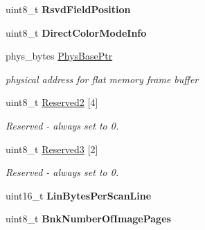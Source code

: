 \begin{DoxyCompactItemize}
\item 
uint8\+\_\+t {\bfseries Rsvd\+Field\+Position}\hypertarget{struct____attribute_____a61fb6dc07b7edbd8a3a94745336f256c}{}\label{struct____attribute_____a61fb6dc07b7edbd8a3a94745336f256c}

\item 
uint8\+\_\+t {\bfseries Direct\+Color\+Mode\+Info}\hypertarget{struct____attribute_____a35fb3e1fc0dc9924bc52977b3a234f9f}{}\label{struct____attribute_____a35fb3e1fc0dc9924bc52977b3a234f9f}

\item 
phys\+\_\+bytes \hyperlink{struct____attribute_____a852a4f68cfbabf08df197128e137bde6}{Phys\+Base\+Ptr}\hypertarget{struct____attribute_____a852a4f68cfbabf08df197128e137bde6}{}\label{struct____attribute_____a852a4f68cfbabf08df197128e137bde6}

\begin{DoxyCompactList}\small\item\em physical address for flat memory frame buffer \end{DoxyCompactList}\item 
uint8\+\_\+t \hyperlink{struct____attribute_____a534ebf7a2bdad17747cfc9cb6cc50c5c}{Reserved2} \mbox{[}4\mbox{]}\hypertarget{struct____attribute_____a534ebf7a2bdad17747cfc9cb6cc50c5c}{}\label{struct____attribute_____a534ebf7a2bdad17747cfc9cb6cc50c5c}

\begin{DoxyCompactList}\small\item\em Reserved -\/ always set to 0. \end{DoxyCompactList}\item 
uint8\+\_\+t \hyperlink{struct____attribute_____a9336499af9094522dbe1bfd4d43934a1}{Reserved3} \mbox{[}2\mbox{]}\hypertarget{struct____attribute_____a9336499af9094522dbe1bfd4d43934a1}{}\label{struct____attribute_____a9336499af9094522dbe1bfd4d43934a1}

\begin{DoxyCompactList}\small\item\em Reserved -\/ always set to 0. \end{DoxyCompactList}\item 
uint16\+\_\+t {\bfseries Lin\+Bytes\+Per\+Scan\+Line}\hypertarget{struct____attribute_____af7036270c257deabc1ebd111faf3e3a5}{}\label{struct____attribute_____af7036270c257deabc1ebd111faf3e3a5}

\item 
uint8\+\_\+t {\bfseries Bnk\+Number\+Of\+Image\+Pages}\hypertarget{struct____attribute_____ad5820084f2b821b85a635df8394f0d9e}{}\label{struct____attribute_____ad5820084f2b821b85a635df8394f0d9e}


\end{DoxyCompactItemize}
